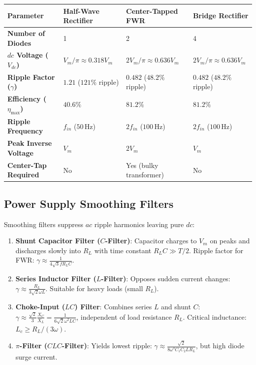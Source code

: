 \documentclass[12pt,a4paper]{article}
\begin{document}
\par\vspace{6pt}\noindent
\begin{tabularx}{\linewidth}{|B{3.4cm}|Y|Y|Y|}
\hline
\textbf{Parameter} & \textbf{Half-Wave Rectifier} & \textbf{Center-Tapped FWR} & \textbf{Bridge Rectifier} \\
\hline
\textbf{Number of Diodes} & 1 & 2 & 4 \\
\hline
\textbf{$dc$ Voltage ($V_{dc}$)} & $V_m/\pi \approx 0.318 V_m$ & $2V_m/\pi \approx 0.636 V_m$ & $2V_m/\pi \approx 0.636 V_m$ \\
\hline
\textbf{Ripple Factor ($\gamma$)} & $1.21$ ($121\%$ ripple) & $0.482$ ($48.2\%$ ripple) & $0.482$ ($48.2\%$ ripple) \\
\hline
\textbf{Efficiency ($\eta_{\max}$)}& $40.6\%$ & $81.2\%$ & $81.2\%$ \\
\hline
\textbf{Ripple Frequency} & $f_{in}$ ($50\,\mathrm{Hz}$) & $2f_{in}$ ($100\,\mathrm{Hz}$) & $2f_{in}$ ($100\,\mathrm{Hz}$) \\
\hline
\textbf{Peak Inverse Voltage} & $V_m$ & $2V_m$ & $V_m$ \\
\hline
\textbf{Center-Tap Required}& No & Yes (bulky transformer) & No \\
\hline
\end{tabularx}
\par\vspace{12pt}

\subsection{Power Supply Smoothing Filters}
Smoothing filters suppress $ac$ ripple harmonics leaving pure $dc$:
\begin{enumerate}[leftmargin=1.5em, itemsep=2pt]
  \item \textbf{Shunt Capacitor Filter ($C$-Filter)}: Capacitor charges to $V_m$ on peaks and discharges slowly into $R_L$ with time constant $R_L C \gg T/2$. Ripple factor for FWR: $\gamma \approx \frac{1}{4\sqrt{3} f R_L C}$.
  \item \textbf{Series Inductor Filter ($L$-Filter)}: Opposes sudden current changes: $\gamma \approx \frac{R_L}{3\sqrt{2}\omega L}$. Suitable for heavy loads (small $R_L$).
  \item \textbf{Choke-Input ($LC$) Filter}: Combines series $L$ and shunt $C$: $\gamma \approx \frac{\sqrt{2}}{3}\frac{X_C}{X_L} = \frac{1}{6\sqrt{2}\omega^2 L C}$, independent of load resistance $R_L$. Critical inductance: $L_c \ge R_L / (3\omega)$.
  \item \textbf{$\pi$-Filter ($CLC$-Filter)}: Yields lowest ripple: $\gamma \approx \frac{\sqrt{2}}{8\omega^3 C_1 C_2 L R_L}$, but high diode surge current.
\end{enumerate}
\end{document}

